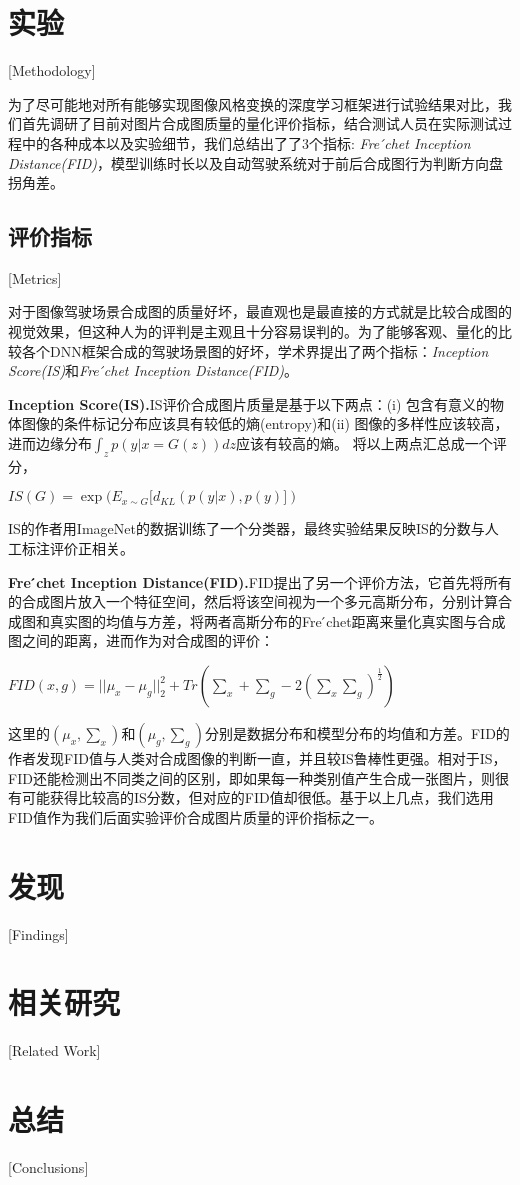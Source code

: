 

\chapter{实验}[Methodology]


为了尽可能地对所有能够实现图像风格变换的深度学习框架进行试验结果对比，我们首先调研了目前对图片合成图质量的量化评价指标，结合测试人员在实际测试过程中的各种成本以及实验细节，我们总结出了了3个指标: \textit{Fre ́chet Inception Distance(FID)}\cite{FID}，模型训练时长以及自动驾驶系统对于前后合成图行为判断方向盘拐角差。

\section{评价指标}[Metrics]

对于图像驾驶场景合成图的质量好坏，最直观也是最直接的方式就是比较合成图的视觉效果，但这种人为的评判是主观且十分容易误判的。为了能够客观、量化的比较各个DNN框架合成的驾驶场景图的好坏，学术界提出了两个指标：\textit{Inception Score(IS)}\cite{IS}和\textit{Fre ́chet Inception Distance(FID)}\cite{FID}。

\textbf{Inception Score(IS).\cite{IS}}\quad IS评价合成图片质量是基于以下两点：(i) 包含有意义的物体图像的条件标记分布应该具有较低的熵(entropy)和(ii) 图像的多样性应该较高，进而边缘分布$\int_z p(y|x=G(z))dz$应该有较高的熵。
将以上两点汇总成一个评分，
\begin{center}
    $IS(G)=\exp{(E_{x\sim G}[d_{KL}(p(y|x), p(y)])}$
\end{center}
IS的作者用ImageNet\cite{ImageNet}的数据训练了一个分类器，最终实验结果反映IS的分数与人工标注评价正相关。

\textbf{Fre ́chet Inception Distance(FID).\cite{FID}}\quad FID提出了另一个评价方法，它首先将所有的合成图片放入一个特征空间，然后将该空间视为一个多元高斯分布，分别计算合成图和真实图的均值与方差，将两者高斯分布的Fre ́chet距离来量化真实图与合成图之间的距离，进而作为对合成图的评价：
\begin{center}
    $FID(x,g)=||\mu_x-\mu_g||_2^2+Tr(\sum_x + \sum_g - 2(\sum_x\sum_g)^{\frac{1}{2}})$
\end{center}
这里的$(\mu_x,\sum_x)$和$(\mu_g,\sum_g)$分别是数据分布和模型分布的均值和方差。FID的作者发现FID值与人类对合成图像的判断一直，并且较IS\cite{IS}鲁棒性更强。相对于IS，FID还能检测出不同类之间的区别，即如果每一种类别值产生合成一张图片，则很有可能获得比较高的IS分数，但对应的FID值却很低。基于以上几点，我们选用FID值作为我们后面实验评价合成图片质量的评价指标之一。


\chapter{发现}[Findings]

\chapter{相关研究}[Related Work]

\chapter{总结}[Conclusions]